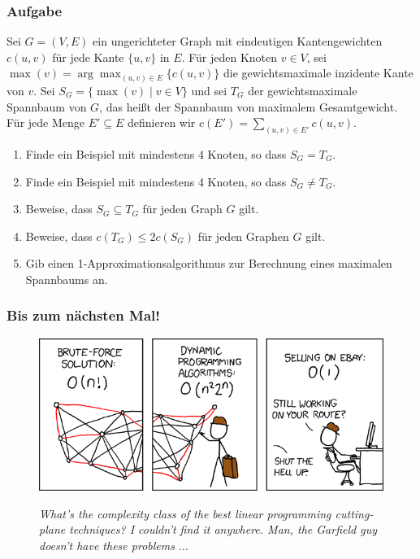 \begin{frame}
	\frametitle{Aufgabe}
	
	Sei $G=(V,E)$ ein ungerichteter Graph mit eindeutigen Kantengewichten $c(u,v)$ für jede Kante $\{u,v\}$ in $E$.
Für jeden Knoten $v \in V$, sei $\max(v)=\arg\max_{(u,v)\in E}\{c(u,v)\}$ die gewichtsmaximale inzidente Kante von $v$.
Sei $S_G=\{\max(v) \mid v \in V\}$ und sei $T_G$ der gewichtsmaximale Spannbaum von $G$, das heißt der Spannbaum von maximalem Gesamtgewicht.
Für jede Menge $E' \subseteq E$ definieren wir $c(E')=\sum_{(u,v)\in E'}c(u,v)$.
\begin{enumerate}
 \item Finde ein Beispiel mit mindestens 4 Knoten, so dass $S_G=T_G$.
 \item Finde ein Beispiel mit mindestens 4 Knoten, so dass $S_G\not=T_G$.
 \item Beweise, dass $S_G\subseteq T_G$ für jeden Graph $G$ gilt.
 \item Beweise, dass $c(T_G)\leq 2c(S_G)$ für jeden Graphen $G$ gilt.
 \item Gib einen 1-Approximationsalgorithmus zur Berechnung eines maximalen Spannbaums an.
\end{enumerate}
\end{frame}

\begin{frame}
	\frametitle{Bis zum nächsten Mal!}
	
	\begin{figure}[H]
		\includegraphics[width= \textwidth]{images/399_traveling_salesman}
		
		\textit{\scriptsize{What's the complexity class of the best linear programming cutting-plane techniques? I couldn't find it anywhere. Man, the Garfield guy doesn't have these problems $\ldots$}}
		
	\end{figure}
\end{frame}


